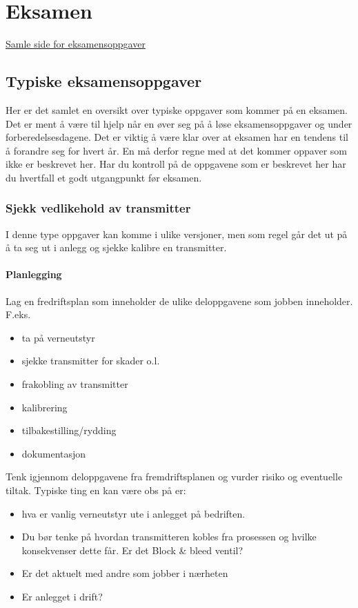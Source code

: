 
\chapter{Eksamen}
\href{https://sokeresultat.udir.no/eksamensoppgaver.html?query=AUT4002}{Samle side for eksamensoppgaver}


\section{Typiske eksamensoppgaver}

Her er det samlet en oversikt over typiske oppgaver som kommer på en eksamen. Det er ment å være til hjelp når en  øver seg på  å løse eksamensoppgaver og under forberedelsesdagene. Det er viktig å være klar over at eksamen har en tendens til å forandre seg for hvert år. En må derfor regne med at det kommer oppaver som ikke er beskrevet her. Har du kontroll på de oppgavene som er beskrevet her har du hvertfall et godt utgangpunkt før eksamen. 

\subsection{Sjekk vedlikehold av transmitter}

I denne type oppgaver kan komme i ulike versjoner, men som regel går det ut på å ta seg ut i anlegg og sjekke kalibre en transmitter. 
\subsubsection*{Planlegging}
Lag en fredriftsplan som inneholder de ulike deloppgavene  som jobben inneholder. 
F.eks. 
\begin{itemize}
	\item ta på verneutstyr
	\item sjekke transmitter for skader o.l. 
	\item frakobling av transmitter
	\item kalibrering
	\item tilbakestilling/rydding
	\item dokumentasjon
\end{itemize}


Tenk igjennom deloppgavene fra fremdriftsplanen og vurder risiko og eventuelle tiltak. Typiske ting en kan være obs på er:
\begin{itemize}
	\item hva er vanlig verneutstyr ute i anlegget på bedriften.
	\item Du bør tenke på hvordan transmitteren kobles fra prosessen og hvilke konsekvenser dette får. Er det Block \& bleed ventil? 
	\item Er det aktuelt med andre som jobber i nærheten
	\item Er anlegget i drift?
\end{itemize}


